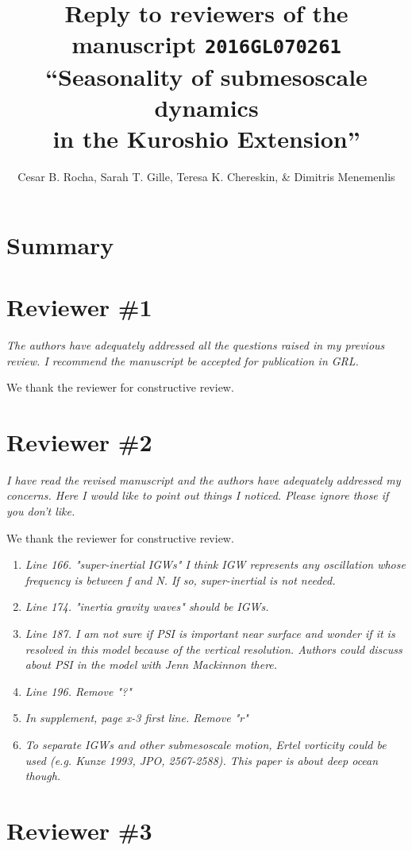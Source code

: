 \documentclass[11pt]{article}
\title{{\normalfont Reply to reviewers of the manuscript \texttt{2016GL070261} }
       ``Seasonality of submesoscale
       dynamics \\in the Kuroshio Extension''}
\author{Cesar B. Rocha,
        Sarah T. Gille, Teresa K. Chereskin, \& Dimitris Menemenlis}
\date{}
\newcommand{\bdp}{\begin{description}}
\newcommand{\edp}{\end{description}}
\begin{document}
%

\maketitle

\section*{Summary}

\section{Reviewer \#1}

{\it The authors have adequately addressed all the questions raised in my
previous review. I recommend the manuscript be accepted for publication in GRL.}

\bdp
  \item We thank the reviewer for constructive review.
\edp

\section{Reviewer \#2}

{\it I have read the revised manuscript and the authors have adequately addressed
     my concerns. Here I would like to point out things I noticed.
     Please ignore those if you don't like.}

\bdp
   \item We thank the reviewer for constructive review.
\edp

\begin{enumerate}

\item {\it Line 166. "super-inertial IGWs" I think IGW represents any oscillation whose
                frequency is between f and N. If so, super-inertial is not needed.}

\item {\it Line 174. "inertia gravity waves" should be IGWs.}

\item {\it Line 187. I am not sure if PSI is important near surface and wonder if it
                is resolved in this model because of the vertical resolution.
                Authors could discuss about PSI in the model with Jenn Mackinnon there.}

\item {\it Line 196. Remove "?"}

\item {\it In supplement, page x-3 first line. Remove "r"}

\item {\it To separate IGWs and other submesoscale motion, Ertel vorticity could be
      used (e.g. Kunze 1993, JPO, 2567-2588). This paper is about deep ocean though.}


\end{enumerate}

\section{Reviewer \#3}



\end{document}
